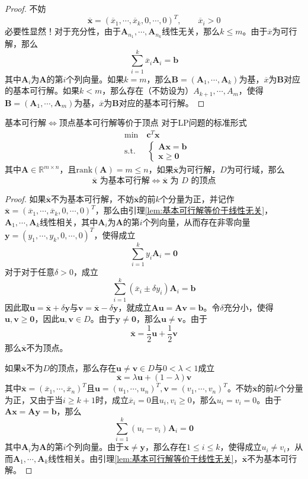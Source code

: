 \documentclass[lang = cn, scheme = chinese, thmcnt = section]{elegantbook}
\newcommand{\R}{\mathbb{R}}            %
\newcommand{\bs}{\boldsymbol}          %
\begin{document}
\begin{proof}
	不妨
	$$
	\overline{\bs{x}}=(\overline{x}_1,\cdots,\overline{x}_k,0,\cdots,0)^T,\qquad \overline{x}_i>0
	$$
	必要性显然！对于充分性，由于$\bs{A}_{n_1},\cdots,\bs{A}_{n_k}$线性无关，那么$k\le m$。由于$\overline{x}$为可行解，那么
	$$
	\sum_{i=1}^{k}\overline{x}_i\bs{A}_i=\bs{b}
	$$
	其中$\bs{A}_i$为$\bs{A}$的第$i$个列向量。如果$k=m$，那么$\bs{B}=(\bs{A}_1,\cdots,\bs{A}_k)$为基，$\overline{x}$为$\bs{B}$对应的基本可行解。如果$k<m$，那么存在（不妨设为）$A_{k+1},\cdots,A_m$，使得$\bs{B}=(\bs{A}_1,\cdots,\bs{A}_{m})$为基，$\overline{x}$为$\bs{B}$对应的基本可行解。
\end{proof}

\begin{theorem}{基本可行解$\iff$顶点}{基本可行解等价于顶点}
	对于LP问题的标准形式
	\begin{align*}
		& \text{min}  \quad \bs{c}^T\bs{x}\\
		& \text{s.t.} \;\, \quad \begin{cases}
			\bs{A} \bs{x} = \bs{b}\\
			\bs{x} \ge \bs{0}
		\end{cases}
	\end{align*}
	其中$\bs{A}\in\R^{m\times n}$，且$\text{rank}(\bs{A})=m\le n$，如果$\overline{\bs{x}}$为可行解，$D$为可行域，那么
	$$
	\overline{\bs{x}}\text{ 为基本可行解}
	\iff
	\overline{\bs{x}}\text{ 为 }D\text{ 的顶点}
	$$
\end{theorem}

\begin{proof}
	如果$\overline{\bs{x}}$不为基本可行解，不妨$\overline{\bs{x}}$的前$k$个分量为正，并记作$\overline{\bs{x}}=(\overline{x}_1,\cdots,\overline{x}_k,0,\cdots,0)^T$，那么由引理\ref{lem:基本可行解等价于线性无关}，$\bs{A}_1,\cdots,\bs{A}_k$线性相关，其中$\bs{A}_i$为$\bs{A}$的第$i$个列向量，从而存在非零向量$\bs{y}=(y_1,\cdots,y_k,0,\cdots,0)^T$，使得成立
	$$
	\sum_{i=1}^{k}y_i\bs{A}_i=\bs{0}
	$$
	对于对于任意$\delta>0$，成立
	$$
	\sum_{i=1}^{k}(\overline{x}_i\pm\delta y_i)\bs{A}_i=\bs{b}
	$$
	因此取$\bs{u}=\overline{\bs{x}}+\delta\bs{y}$与$\bs{v}=\overline{\bs{x}}-\delta\bs{y}$，就成立$\bs{Au}=\bs{Av}=\bs{b}$。令$\delta$充分小，使得$\bs{u},\bs{v}\ge \bs{0}$，因此$\bs{u},\bs{v}\in D$。由于$\bs{y}\ne \bs{0}$，那么$\bs{u}\ne\bs{v}$。由于
	$$
	\overline{\bs{x}}=\frac{1}{2}\bs{u}+\frac{1}{2}\bs{v}
	$$
	那么$\overline{\bs{x}}$不为顶点。
	
	如果$\overline{\bs{x}}$不为$D$的顶点，那么存在$\bs{u}\ne\bs{v}\in D$与$0<\lambda<1$成立
	$$
	\overline{\bs{x}}=\lambda\bs{u}+(1-\lambda)\bs{v}
	$$
	其中$\overline{\bs{x}}=(\overline{x}_1,\cdots,\overline{x}_n)^T$且$\bs{u}=(u_1,\cdots,u_n)^T,\bs{v}=(v_1,\cdots,v_n)^T$。不妨$\overline{\bs{x}}$的前$k$个分量为正，又由于当$i\ge k+1$时，成立$\overline{x}_i=0$且$u_i,v_i\ge 0$，那么$u_i=v_i=0$。由于$\bs{Ax}=\bs{Ay}=\bs{b}$，那么
	$$
	\sum_{i=1}^{k}(u_i-v_i)\bs{A}_i=\bs{0}
	$$
	其中$\bs{A}_i$为$\bs{A}$的第$i$个列向量。由于$\bs{x}\ne\bs{y}$，那么存在$1\le i\le k$，使得成立$u_i\ne v_i$，从而$\bs{A}_1,\cdots,\bs{A}_k$线性相关。由引理\ref{lem:基本可行解等价于线性无关}，$\overline{\bs{x}}$不为基本可行解。
\end{proof}
\end{document}
